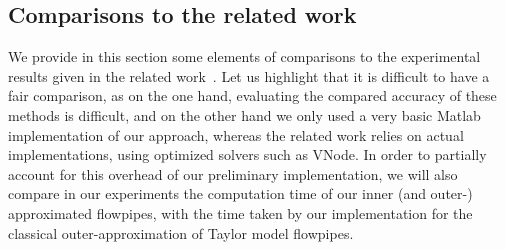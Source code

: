 


\subsection{Comparisons to the related work}
\label{sec:exp_compar}
We provide in this section some elements of comparisons to the experimental results given in the related work~\cite{Underapproxflowpipes,underapprox16}.
Let us highlight that it is difficult to have a fair comparison, as on the one hand, evaluating the compared accuracy of these methods is difficult, 
and on the other hand we only used a very basic Matlab implementation of our approach, whereas the related work relies on actual implementations,
using optimized solvers such as VNode. In order to partially account for this overhead of our preliminary implementation, we will also compare in our experiments 
the computation time of our inner (and outer-) approximated flowpipes, with the time taken by our implementation for the classical outer-approximation 
of Taylor model flowpipes. 



